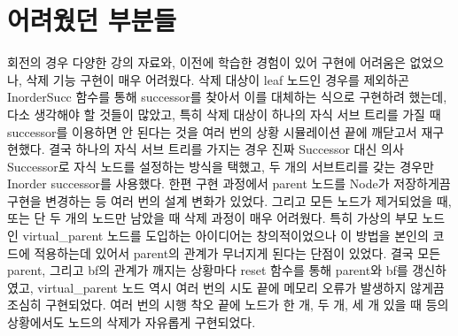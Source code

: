 \documentclass{article}
\begin{document}
\section{어려웠던 부분들}
회전의 경우 다양한 강의 자료와, 이전에 학습한 경험이 있어 구현에 어려움은 없었으나, 삭제 기능 구현이 매우 어려웠다. 삭제 대상이 leaf 노드인 경우를 제외하곤 InorderSucc 함수를 통해 successor를 찾아서 이를 대체하는 식으로 구현하려 했는데, 다소 생각해야 할 것들이 많았고, 특히 삭제 대상이 하나의 자식 서브 트리를 가질 때 successor를 이용하면 안 된다는 것을 여러 번의 상황 시뮬레이션 끝에 깨닫고서 재구현했다. 결국 하나의 자식 서브 트리를 가지는 경우 진짜 Successor 대신 의사 Successor로 자식 노드를 설정하는 방식을 택했고, 두 개의 서브트리를 갖는 경우만 Inorder successor를 사용했다. 한편 구현 과정에서 parent 노드를 Node가 저장하게끔 구현을 변경하는 등 여러 번의 설계 변화가 있었다. 그리고 모든 노드가 제거되었을 때, 또는 단 두 개의 노드만 남았을 때 삭제 과정이 매우 어려웠다. 특히 가상의 부모 노드인 virtual\_parent 노드를 도입하는 아이디어는 창의적이었으나 이 방법을 본인의 코드에 적용하는데 있어서 parent의 관계가 무너지게 된다는 단점이 있었다. 결국 모든 parent, 그리고 bf의 관계가 깨지는 상황마다 reset 함수를 통해 parent와 bf를 갱신하였고, virtual\_parent 노드 역시 여러 번의 시도 끝에 메모리 오류가 발생하지 않게끔 조심히 구현되었다. 여러 번의 시행 착오 끝에 노드가 한 개, 두 개, 세 개 있을 때 등의 상황에서도 노드의 삭제가 자유롭게 구현되었다.
\end{document}
